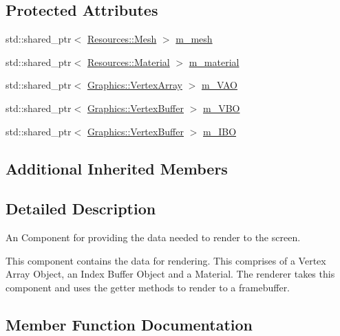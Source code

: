 \subsection*{Protected Attributes}
\begin{DoxyCompactItemize}
\item 
std\+::shared\+\_\+ptr$<$ \hyperlink{struct_cookie_eng_1_1_resources_1_1_mesh}{Resources\+::\+Mesh} $>$ \hyperlink{class_cookie_eng_1_1_components_1_1_renderable_a9da5e010c1d6c0ccb008b2af664b925a}{m\+\_\+mesh}
\item 
std\+::shared\+\_\+ptr$<$ \hyperlink{class_cookie_eng_1_1_resources_1_1_material}{Resources\+::\+Material} $>$ \hyperlink{class_cookie_eng_1_1_components_1_1_renderable_a69e36f6c8b8d58c978d86f2591c53ec5}{m\+\_\+material}
\item 
std\+::shared\+\_\+ptr$<$ \hyperlink{class_cookie_eng_1_1_graphics_1_1_vertex_array}{Graphics\+::\+Vertex\+Array} $>$ \hyperlink{class_cookie_eng_1_1_components_1_1_renderable_ad9486a5a4befa25f74fe9e4d553f2ce6}{m\+\_\+\+V\+AO}
\item 
std\+::shared\+\_\+ptr$<$ \hyperlink{class_cookie_eng_1_1_graphics_1_1_vertex_buffer}{Graphics\+::\+Vertex\+Buffer} $>$ \hyperlink{class_cookie_eng_1_1_components_1_1_renderable_a09cf84ce90d1e6474a0e89f035f74b7c}{m\+\_\+\+V\+BO}
\item 
std\+::shared\+\_\+ptr$<$ \hyperlink{class_cookie_eng_1_1_graphics_1_1_vertex_buffer}{Graphics\+::\+Vertex\+Buffer} $>$ \hyperlink{class_cookie_eng_1_1_components_1_1_renderable_ad78ea55ae87ccf49d3643e50aed49d2c}{m\+\_\+\+I\+BO}
\end{DoxyCompactItemize}
\subsection*{Additional Inherited Members}


\subsection{Detailed Description}
An Component for providing the data needed to render to the screen. 

This component contains the data for rendering. This comprises of a Vertex Array Object, an Index Buffer Object and a Material. The renderer takes this component and uses the getter methods to render to a framebuffer. 

\subsection{Member Function Documentation}
\mbox{\label{class_cookie_eng_1_1_components_1_1_renderable_a57c744030c4b1271c7ceaeedd0c08533}} 
